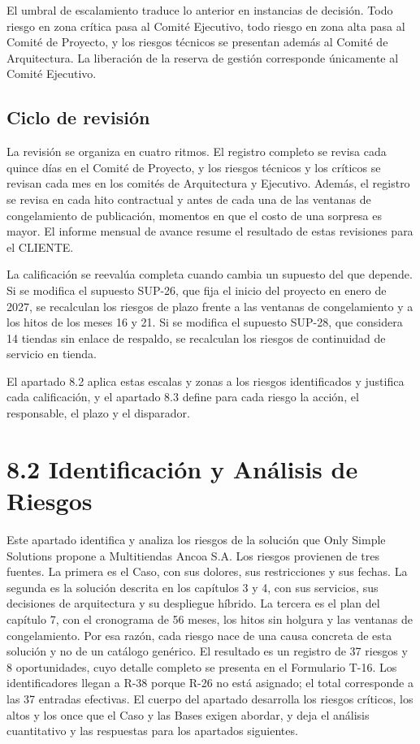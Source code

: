\documentclass[11pt]{article}
\begin{document}
El umbral de escalamiento traduce lo anterior en instancias de decisión. Todo riesgo en zona crítica pasa al Comité Ejecutivo, todo riesgo en zona alta pasa al Comité de Proyecto, y los riesgos técnicos se presentan además al Comité de Arquitectura. La liberación de la reserva de gestión corresponde únicamente al Comité Ejecutivo.

\subsection{Ciclo de revisión}

La revisión se organiza en cuatro ritmos. El registro completo se revisa cada quince días en el Comité de Proyecto, y los riesgos técnicos y los críticos se revisan cada mes en los comités de Arquitectura y Ejecutivo. Además, el registro se revisa en cada hito contractual y antes de cada una de las ventanas de congelamiento de publicación, momentos en que el costo de una sorpresa es mayor. El informe mensual de avance resume el resultado de estas revisiones para el CLIENTE.

La calificación se reevalúa completa cuando cambia un supuesto del que depende. Si se modifica el supuesto SUP-26, que fija el inicio del proyecto en enero de 2027, se recalculan los riesgos de plazo frente a las ventanas de congelamiento y a los hitos de los meses 16 y 21. Si se modifica el supuesto SUP-28, que considera 14 tiendas sin enlace de respaldo, se recalculan los riesgos de continuidad de servicio en tienda.

El apartado 8.2 aplica estas escalas y zonas a los riesgos identificados y justifica cada calificación, y el apartado 8.3 define para cada riesgo la acción, el responsable, el plazo y el disparador.

\section{8.2 Identificación y Análisis de Riesgos}\label{identificaciuxf3n-y-anuxe1lisis-de-riesgos}

Este apartado identifica y analiza los riesgos de la solución que Only Simple Solutions propone a Multitiendas Ancoa S.A. Los riesgos provienen de tres fuentes. La primera es el Caso, con sus dolores, sus restricciones y sus fechas. La segunda es la solución descrita en los capítulos 3 y 4, con sus servicios, sus decisiones de arquitectura y su despliegue híbrido. La tercera es el plan del capítulo 7, con el cronograma de 56 meses, los hitos sin holgura y las ventanas de congelamiento. Por esa razón, cada riesgo nace de una causa concreta de esta solución y no de un catálogo genérico. El resultado es un registro de 37 riesgos y 8 oportunidades, cuyo detalle completo se presenta en el Formulario T-16. Los identificadores llegan a R-38 porque R-26 no está asignado; el total corresponde a las 37 entradas efectivas. El cuerpo del apartado desarrolla los riesgos críticos, los altos y los once que el Caso y las Bases exigen abordar, y deja el análisis cuantitativo y las respuestas para los apartados siguientes.
\end{document}
